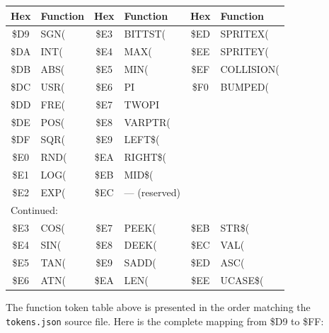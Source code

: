 \begin{center}
\begin{longtable}{cl|cl|cl}
\toprule
\textbf{Hex} & \textbf{Function} &
\textbf{Hex} & \textbf{Function} &
\textbf{Hex} & \textbf{Function} \\
\midrule
\endhead
\$D9 & SGN(       & \$E3 & BITTST(    & \$ED & SPRITEX(     \\
\$DA & INT(       & \$E4 & MAX(       & \$EE & SPRITEY(     \\
\$DB & ABS(       & \$E5 & MIN(       & \$EF & COLLISION(   \\
\$DC & USR(       & \$E6 & PI         & \$F0 & BUMPED(      \\
\$DD & FRE(       & \$E7 & TWOPI      &      &              \\
\$DE & POS(       & \$E8 & VARPTR(    &      &              \\
\$DF & SQR(       & \$E9 & LEFT\$(    &      &              \\
\$E0 & RND(       & \$EA & RIGHT\$(   &      &              \\
\$E1 & LOG(       & \$EB & MID\$(     &      &              \\
\$E2 & EXP(       & \$EC & --- (reserved) & &              \\
\midrule
\multicolumn{6}{l}{\small Continued:} \\
\midrule
\$E3 & COS(       & \$E7 & PEEK(      & \$EB & STR\$(     \\
\$E4 & SIN(       & \$E8 & DEEK(      & \$EC & VAL(       \\
\$E5 & TAN(       & \$E9 & SADD(      & \$ED & ASC(       \\
\$E6 & ATN(       & \$EA & LEN(       & \$EE & UCASE\$(   \\
\bottomrule
\end{longtable}
\end{center}

\begin{warningbox}
The function token table above is presented in the order matching the
\texttt{tokens.json} source file.  Here is the complete mapping from
\$D9 to \$FF:
\end{warningbox}


